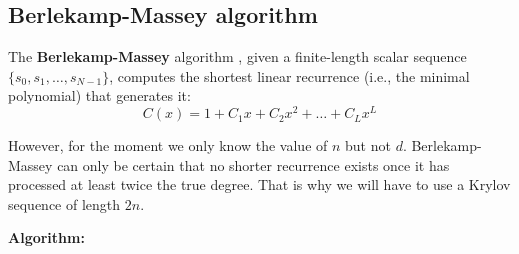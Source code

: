 \documentclass[a4paper, 11pt]{article}
\begin{document}
\subsection{Berlekamp-Massey algorithm}

The \textbf{Berlekamp-Massey} algorithm \cite{Massey1969}, given a finite-length scalar sequence $\{s_0,s_1,\dots,s_{N-1}\}$, computes the shortest linear recurrence (i.e., the minimal polynomial) that generates it:
\begin{equation}
    C(x) = 1 + C_1x + C_2x^2 + \dots + C_Lx^L
\end{equation}

However, for the moment we only know the value of $n$ but not $d$. Berlekamp-Massey can only be certain that no shorter recurrence exists once it has processed at least twice the true degree. That is why we will have to use a Krylov sequence of length $2n$.

\textbf{Algorithm:}
\end{document}

